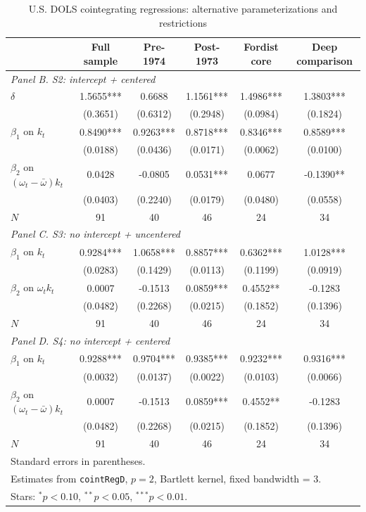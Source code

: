 \begin{table}[htbp]
\centering
\caption{U.S. DOLS cointegrating regressions: alternative parameterizations and restrictions}
\label{tab:us_dols_appendix_s2_s4}
\scriptsize
\begin{tabular}{lccccc}
\hline
 & Full sample & Pre-1974 & Post-1973 & Fordist core & Deep comparison \\
\hline
\multicolumn{6}{l}{\textit{Panel B. S2: intercept + centered}} \\
$\delta$ & 1.5655*** & 0.6688 & 1.1561*** & 1.4986*** & 1.3803*** \\
 & (0.3651) & (0.6312) & (0.2948) & (0.0984) & (0.1824) \\
$\beta_1$ on $k_t$ & 0.8490*** & 0.9263*** & 0.8718*** & 0.8346*** & 0.8589*** \\
 & (0.0188) & (0.0436) & (0.0171) & (0.0062) & (0.0100) \\
$\beta_2$ on $(\omega_t-\bar\omega)k_t$ & 0.0428 & -0.0805 & 0.0531*** & 0.0677 & -0.1390** \\
 & (0.0403) & (0.2240) & (0.0179) & (0.0480) & (0.0558) \\
$N$ & 91 & 40 & 46 & 24 & 34 \\
\hline
\multicolumn{6}{l}{\textit{Panel C. S3: no intercept + uncentered}} \\
$\beta_1$ on $k_t$ & 0.9284*** & 1.0658*** & 0.8857*** & 0.6362*** & 1.0128*** \\
 & (0.0283) & (0.1429) & (0.0113) & (0.1199) & (0.0919) \\
$\beta_2$ on $\omega_t k_t$ & 0.0007 & -0.1513 & 0.0859*** & 0.4552** & -0.1283 \\
 & (0.0482) & (0.2268) & (0.0215) & (0.1852) & (0.1396) \\
$N$ & 91 & 40 & 46 & 24 & 34 \\
\hline
\multicolumn{6}{l}{\textit{Panel D. S4: no intercept + centered}} \\
$\beta_1$ on $k_t$ & 0.9288*** & 0.9704*** & 0.9385*** & 0.9232*** & 0.9316*** \\
 & (0.0032) & (0.0137) & (0.0022) & (0.0103) & (0.0066) \\
$\beta_2$ on $(\omega_t-\bar\omega)k_t$ & 0.0007 & -0.1513 & 0.0859*** & 0.4552** & -0.1283 \\
 & (0.0482) & (0.2268) & (0.0215) & (0.1852) & (0.1396) \\
$N$ & 91 & 40 & 46 & 24 & 34 \\
\hline
\multicolumn{6}{l}{\footnotesize Standard errors in parentheses.} \\
\multicolumn{6}{l}{\footnotesize Estimates from \texttt{cointRegD}, $p=2$, Bartlett kernel, fixed bandwidth = 3.} \\
\multicolumn{6}{l}{\footnotesize Stars: $^{*}p<0.10$, $^{**}p<0.05$, $^{***}p<0.01$.} \\
\end{tabular}
\end{table}
